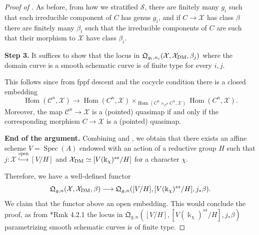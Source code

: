 \documentclass{amsart}
\newcommand{\sC}{\mathscr{C}}
\newcommand{\sS}{\mathscr{S}}
\newcommand{\cX}{\mathcal{X}}
\newcommand{\spec}{\operatorname{Spec}}
\newcommand{\Hom}{\operatorname{Hom}}
\newcommand{\dm}{{\rm DM}}
\theoremstyle{definition}
\theoremstyle{definition}
\begin{document}
{\begin{proof}[Proof of ]
         As before, from how we stratified $\sS$, there are finitely many $g_i$ such that each irreducible component of $C$ has genus $g_i$, and if $C\to \cX$ has class $\beta$ there are finitely many $\beta_i$ such that the irreducible components of $C$ are such that their morphism to $\cX$ have class $\beta_i$.

         \textbf{Step 3.} It suffices to show that the locus in $\mathfrak{Q}_{g_i, n_i}(\cX,\cX_\dm,\beta_j)$ where the domain curve is a smooth schematic curve is of finite type for every $i,j$.

         This follows since from fppf descent and the cocycle condition there is a closed embedding \[\Hom(\sC^n,\cX)\to\Hom(C^n,\cX)\times_{\Hom(C^n\times_{\sC^n} C^n,\cX)}\Hom(C^n,\cX).\]
         Moreover, the map $\sC^n\to \cX$ is a (pointed) quasimap if and only if the corresponding morphism $C\to \cX$ is a (pointed) quasimap. 

         \textbf{End of the argument.}
         Combining  and , we obtain that there exists an affine scheme $V=\spec(A)$ endowed with an action of a reductive group $H$ such that $j:\cX \overset{\text{open}}{\hookrightarrow} [V/H]$ and $\cX_\dm \simeq [V(\Bbbk_\chi)^{ss}/H]$ for a character $\chi$.

    Therefore, we have a well-defined functor
    \[ \mathfrak{Q}_{g,n}(\cX,\cX_\dm,\beta) \longrightarrow \mathfrak{Q}_{g,n}([V/H],[V(\Bbbk_\chi)^{ss}/H],j_*\beta).\]
    We claim that the functor above an open embedding. This would conclude the proof, as from \cite{ciocan2014stable}*{Rmk 4.2.1} the locus in $\mathfrak{Q}_{g,n}([V/H],[V(\Bbbk_\chi)^{ss}/H],j_*\beta)$ parametrizing smooth schematic curves is of finite type. 
    

\end{proof}}
\end{document}
